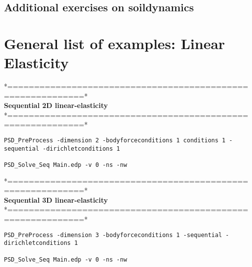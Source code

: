 \subsection{Additional exercises on soildynamics}
{
	\renewcommand{\subsection}{\subsubsection}
	
}



\pagebreak

\section{General list of examples: Linear Elasticity}
 *============================================================*\\
  \textbf{Sequential  2D linear-elasticity}\\                   
 *============================================================*\\
\begin{lstlisting}[style=BashInputStyle] 
PSD_PreProcess -dimension 2 -bodyforceconditions 1 conditions 1 -sequential -dirichletconditions 1 
	
PSD_Solve_Seq Main.edp -v 0 -ns -nw 
\end{lstlisting}


*============================================================*\\
 \textbf{Sequential  3D linear-elasticity}                   \\
*============================================================*\\
\begin{lstlisting}[style=BashInputStyle] 
PSD_PreProcess -dimension 3 -bodyforceconditions 1 -sequential -dirichletconditions 1

PSD_Solve_Seq Main.edp -v 0 -ns -nw
\end{lstlisting}


